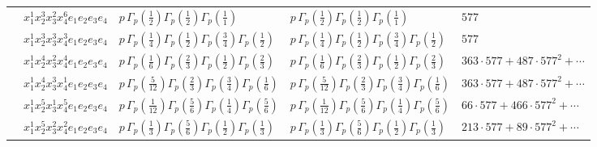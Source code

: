 \documentclass[11pt]{article}
\begin{document}
\begin{table}[ht]
{\begin{tabular}{@{}lllll@{}}
 & $x_{1}^{1} x_{2}^{3} x_{3}^{2} x_{4}^{6}  e_{1} e_{2} e_{3} e_{4}$ & $p \, \Gamma_p \left( \frac{1}{2} \right) \Gamma_p \left( \frac{1}{2} \right) \Gamma_p \left( \frac{1}{1} \right)$ & $p \, \Gamma_p \left( \frac{1}{2} \right) \Gamma_p \left( \frac{1}{2} \right) \Gamma_p \left( \frac{1}{1} \right)$ & $577$ \\
 & $x_{1}^{1} x_{2}^{3} x_{3}^{3} x_{4}^{3}  e_{1} e_{2} e_{3} e_{4}$ & $p \, \Gamma_p \left( \frac{1}{4} \right) \Gamma_p \left( \frac{1}{2} \right) \Gamma_p \left( \frac{3}{4} \right) \Gamma_p \left( \frac{1}{2} \right)$ & $p \, \Gamma_p \left( \frac{1}{4} \right) \Gamma_p \left( \frac{1}{2} \right) \Gamma_p \left( \frac{3}{4} \right) \Gamma_p \left( \frac{1}{2} \right)$ & $577$ \\
 & $x_{1}^{1} x_{2}^{4} x_{3}^{2} x_{4}^{4}  e_{1} e_{2} e_{3} e_{4}$ & $p \, \Gamma_p \left( \frac{1}{6} \right) \Gamma_p \left( \frac{2}{3} \right) \Gamma_p \left( \frac{1}{2} \right) \Gamma_p \left( \frac{2}{3} \right)$ & $p \, \Gamma_p \left( \frac{1}{6} \right) \Gamma_p \left( \frac{2}{3} \right) \Gamma_p \left( \frac{1}{2} \right) \Gamma_p \left( \frac{2}{3} \right)$ & $363{\cdot}577{+}487{\cdot}577^{2}{+}\cdots$ \\
 & $x_{1}^{1} x_{2}^{4} x_{3}^{3} x_{4}^{1}  e_{1} e_{2} e_{3} e_{4}$ & $p \, \Gamma_p \left( \frac{5}{12} \right) \Gamma_p \left( \frac{2}{3} \right) \Gamma_p \left( \frac{3}{4} \right) \Gamma_p \left( \frac{1}{6} \right)$ & $p \, \Gamma_p \left( \frac{5}{12} \right) \Gamma_p \left( \frac{2}{3} \right) \Gamma_p \left( \frac{3}{4} \right) \Gamma_p \left( \frac{1}{6} \right)$ & $363{\cdot}577{+}487{\cdot}577^{2}{+}\cdots$ \\
 & $x_{1}^{1} x_{2}^{5} x_{3}^{1} x_{4}^{5}  e_{1} e_{2} e_{3} e_{4}$ & $p \, \Gamma_p \left( \frac{1}{12} \right) \Gamma_p \left( \frac{5}{6} \right) \Gamma_p \left( \frac{1}{4} \right) \Gamma_p \left( \frac{5}{6} \right)$ & $p \, \Gamma_p \left( \frac{1}{12} \right) \Gamma_p \left( \frac{5}{6} \right) \Gamma_p \left( \frac{1}{4} \right) \Gamma_p \left( \frac{5}{6} \right)$ & $66{\cdot}577{+}466{\cdot}577^{2}{+}\cdots$ \\
 & $x_{1}^{1} x_{2}^{5} x_{3}^{2} x_{4}^{2}  e_{1} e_{2} e_{3} e_{4}$ & $p \, \Gamma_p \left( \frac{1}{3} \right) \Gamma_p \left( \frac{5}{6} \right) \Gamma_p \left( \frac{1}{2} \right) \Gamma_p \left( \frac{1}{3} \right)$ & $p \, \Gamma_p \left( \frac{1}{3} \right) \Gamma_p \left( \frac{5}{6} \right) \Gamma_p \left( \frac{1}{2} \right) \Gamma_p \left( \frac{1}{3} \right)$ & $213{\cdot}577{+}89{\cdot}577^{2}{+}\cdots$ \\

\end{tabular}}
\end{table}
\end{document}
